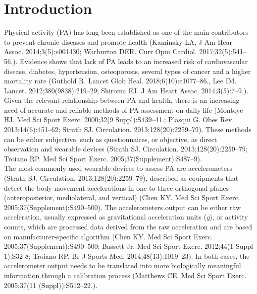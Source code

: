 \documentclass[11pt]{article}
\begin{document}
\section*{Introduction}

Physical activity (PA) has long been established as one of the main contributors to prevent chronic diseases and promote health {\tiny (Kaminsky LA, J Am Hear Assoc. 2014;3(5):e001430; Warburton DER. Curr Opin Cardiol. 2017;32(5):541–56.)}. Evidence shows that lack of PA leads to an increased risk of cardiovascular disease, diabetes, hypertension, osteoporosis, several types of cancer and a higher mortality rate {\tiny (Guthold R. Lancet Glob Heal. 2018;6(10):e1077–86., Lee IM. Lancet. 2012;380(9838):219–29; Shiroma EJ. J Am Heart Assoc. 2014;3(5):7–9.)}. Given the relevant relationship between PA and health, there is an increasing need of accurate and reliable methods of PA assessment on daily life {\tiny (Montoye HJ. Med Sci Sport Exerc. 2000;32(9 Suppl):S439–41.; Plasqui G. Obes Rev. 2013;14(6):451–62; Strath SJ. Circulation. 2013;128(20):2259–79)}. These methods can be either subjective, such as questionnaires, or objective, as direct observation and wearable devices {\tiny (Strath SJ. Circulation. 2013;128(20):2259–79; Troiano RP. Med Sci Sport Exerc. 2005;37(Supplement):S487–9)}.\\

\noindent
The most commonly used wearable devices to assess PA are accelerometers {\tiny (Strath SJ. Circulation. 2013;128(20):2259–79)}, described as equipments that detect the body movement accelerations in one to three orthogonal planes (anteroposterior, mediolateral, and vertical) {\tiny (Chen KY. Med Sci Sport Exerc. 2005;37(Supplement):S490–500)}. The accelerometers output can be either raw acceleration, usually expressed as gravitational acceleration units (\textit{g}), or activity counts, which are processed data derived from the raw acceleration and are based on manufacturer-specific algorithm {\tiny (Chen KY. Med Sci Sport Exerc. 2005;37(Supplement):S490–500; Bassett  Jr. Med Sci Sport Exerc. 2012;44(1 Suppl 1):S32-8; Troiano RP. Br J Sports Med. 2014;48(13):1019–23)}. In both cases, the accelerometer output needs to be translated into more biologically meaningful information through a calibration process {\tiny (Matthews CE. Med Sci Sport Exerc. 2005;37(11 (Suppl)):S512–22.)}. \\
\end{document}

